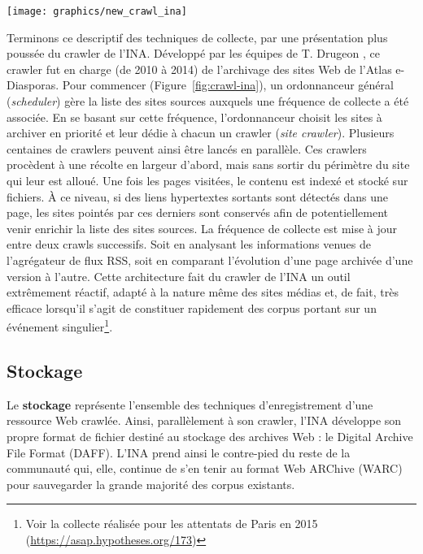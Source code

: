 \documentclass[symmetric,justified,marginals=raggedouter]{tufte-book}
\begin{document}
\begin{figure*}%
  \texttt{[image: graphics/new\_crawl\_ina]}
  \caption{Fonctionnement général du système de collecte de l'INA}
  \label{fig:crawl-ina}
\end{figure*}

\noindent Terminons ce descriptif des techniques de collecte, par une présentation plus poussée du crawler de l'INA. Développé par les équipes de T. Drugeon \citep{drugeon_technical_2005}, ce crawler fut en charge (de 2010 à 2014) de l'archivage des sites Web de l'Atlas e-Diasporas. Pour commencer (Figure~\ref{fig:crawl-ina}), un ordonnanceur général (\textit{scheduler}) gère la liste des sites sources auxquels une fréquence de collecte a été associée. En se basant sur cette fréquence, l'ordonnanceur choisit les sites à archiver en priorité et leur dédie à chacun un crawler (\textit{site crawler}). Plusieurs centaines de crawlers peuvent ainsi être lancés en parallèle. Ces crawlers procèdent à une récolte en largeur d'abord, mais sans sortir du périmètre du site qui leur est alloué. Une fois les pages visitées, le contenu est indexé et stocké sur fichiers. À ce niveau, si des liens hypertextes sortants sont détectés dans une page, les sites pointés par ces derniers sont conservés afin de potentiellement venir enrichir la liste des sites sources. La fréquence de collecte est mise à jour entre deux crawls successifs. Soit en analysant les informations venues de l'agrégateur de flux RSS, soit en comparant l'évolution d'une page archivée d'une version à l'autre. Cette architecture fait du crawler de l'INA un outil extrêmement réactif, adapté à la nature même des sites médias et, de fait, très efficace lorsqu'il s'agit de constituer rapidement des corpus portant sur un événement singulier\footnote{\RaggedOuter Voir la collecte réalisée pour les attentats de Paris en 2015 (\url{https://asap.hypotheses.org/173})}.

\subsection{Stockage}

\noindent Le \textbf{stockage} représente l'ensemble des techniques d'enregistrement d'une ressource Web crawlée. Ainsi, parallèlement à son crawler, l'INA développe son propre format de fichier destiné au stockage des archives Web : le Digital Archive File Format (DAFF). L'INA prend ainsi le contre-pied du reste de la communauté qui, elle, continue de s'en tenir au format Web ARChive (WARC) pour sauvegarder la grande majorité des corpus existants.
\end{document}
